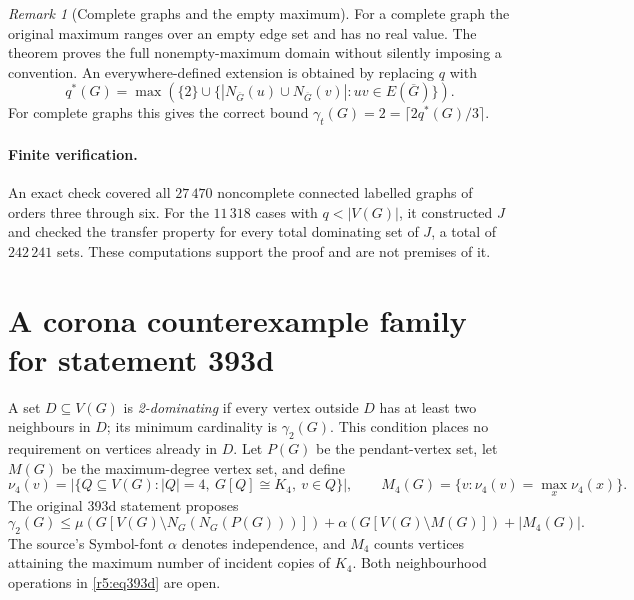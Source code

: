 \documentclass[11pt,a4paper]{article}
\theoremstyle{remark}
\newtheorem{remark}[theorem]{Remark}
\begin{document}
\begin{remark}[Complete graphs and the empty maximum]\label{r5:305domain}
For a complete graph the original maximum ranges over an empty edge
set and has no real value. The theorem proves the full nonempty-maximum
domain without silently imposing a convention. An everywhere-defined
extension is obtained by replacing \(q\) with
\[
q^*(G)=\max\!\left(
\{2\}\cup
\bigl\{|N_{\overline G}(u)\cup N_{\overline G}(v)|:
                         uv\in E(\overline G)\bigr\}\right).
\]
For complete graphs this gives the correct bound
\(\gamma_t(G)=2=\lceil2q^*(G)/3\rceil\).
\end{remark}

\paragraph{Finite verification.}
An exact check covered all \(27\,470\) noncomplete connected labelled
graphs of orders three through six. For the \(11\,318\) cases with
\(q<|V(G)|\), it constructed \(J\) and checked the transfer property
for every total dominating set of \(J\), a total of \(242\,241\) sets.
These computations support the proof and are not premises of it.

\section{A corona counterexample family for statement 393d}
\label{r5:sec393d}

A set \(D\subseteq V(G)\) is \emph{2-dominating} if every vertex
outside \(D\) has at least two neighbours in \(D\); its minimum
cardinality is \(\gamma_2(G)\). This condition places no requirement
on vertices already in \(D\). Let \(P(G)\) be the pendant-vertex set,
let \(M(G)\) be the maximum-degree vertex set, and define
\[
\nu_4(v)=|\{Q\subseteq V(G): |Q|=4,\ G[Q]\cong K_4,\ v\in Q\}|,
\qquad
M_4(G)=\{v:\nu_4(v)=\max_x\nu_4(x)\}.
\]
The original 393d statement \cite{WOWII} proposes
\begin{equation}\label{r5:eq393d}
\gamma_2(G)\le
\mu\!\left(G[V(G)\setminus N_G(N_G(P(G)))]\right)
+\alpha\!\left(G[V(G)\setminus M(G)]\right)+|M_4(G)|.
\end{equation}
The source's Symbol-font \(\alpha\) denotes independence, and \(M_4\)
counts vertices attaining the maximum number of incident copies of
\(K_4\). Both neighbourhood operations in \eqref{r5:eq393d} are open.
\end{document}
